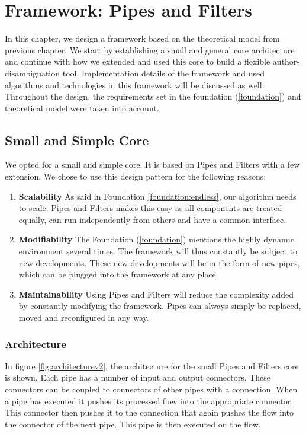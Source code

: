 \chapter{Framework: Pipes and Filters}
\label{newframework}

In this chapter, we design a framework based on the theoretical model from previous chapter. We start by establishing a small and general core architecture and continue with how we extended and used this core to build a flexible author-disambiguation tool. Implementation details of the framework and used algorithms and technologies in this framework will be discussed as well. Throughout the design, the requirements set in the foundation (\autoref{foundation}) and theoretical model were taken into account.

\section{Small and Simple Core}

We opted for a small and simple core. It is based on Pipes and Filters with a few extension. We chose to use this design pattern for the following reasons:

\begin{enumerate}
\item \textbf{Scalability} As said in Foundation \autoref{foundation:endless}, our algorithm needs to scale. Pipes and Filters makes this easy as all components are treated equally, can run independently from others and have a common interface.
\item \textbf{Modifiability} The Foundation (\autoref{foundation}) mentions the highly dynamic environment several times. The framework will thus constantly be subject to new developments. These new developments will be in the form of new pipes, which can be plugged into the framework at any place.
\item \textbf{Maintainability} Using Pipes and Filters will reduce the complexity added by constantly modifying the framework. Pipes can always simply be replaced, moved and reconfigured in any way.
\end{enumerate}

\subsection{Architecture}

In figure \autoref{fig:architecturev2}, the architecture for the small Pipes and Filters core is shown. Each pipe has a number of input and output connectors. These connectors can be coupled to connectors of other pipes with a connection. When a pipe has executed it pushes its processed flow into the appropriate connector. This connector then pushes it to the connection that again pushes the flow into the connector of the next pipe. This pipe is then executed on the flow.

